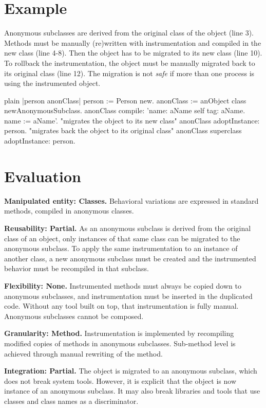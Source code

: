 \documentclass[10pt,twoside,english]{_support/latex/sbabook/sbabook}
\begin{document}
\section{Example}
Anonymous subclasses are derived from the original class of the object (line 3). Methods must be manually (re)written with instrumentation and compiled in the new class (line 4-8). Then the object has to be migrated to its new class (line 10). To rollback the instrumentation, the object must be manually migrated back to its original class (line 12). The migration is not \textit{safe} if more than one process is using the instrumented object.

\begin{displaycode}{plain}
|person anonClass|
  person := Person new.
	anonClass := anObject class newAnonymousSubclass.
	anonClass
		compile:
			'name: aName
				self tag: aName.
				name := aName'.
  "migrates the object to its new class"
	anonClass adoptInstance: person.
  "migrates back the object to its original class"
  anonClass superclass adoptInstance: person.
\end{displaycode}
\section{Evaluation}
\textbf{Manipulated entity: Classes.} Behavioral variations are expressed in standard methods, compiled in anonymous classes.

\textbf{Reusability: Partial.} As an anonymous subclass is derived from the original class of an object, only instances of that same class can be migrated to the anonymous subclass. To apply the same instrumentation to an instance of another class, a new anonymous subclass must be created and the instrumented behavior must be recompiled in that subclass.

\textbf{Flexibility: None.} Instrumented methods must always be copied down to anonymous subclasses, and instrumentation must be inserted in the duplicated code. Without any tool built on top, that instrumentation is fully manual. Anonymous subclasses cannot be composed.

\textbf{Granularity: Method.} Instrumentation is implemented by recompiling modified copies of methods in anonymous subclasses. Sub-method level is achieved through manual rewriting of the method.

\textbf{Integration: Partial.} The object is migrated to an anonymous subclass, which does not break system tools. However, it is explicit that the object is now instance of an anonymous subclass. It may also break libraries and tools that use classes and class names as a discriminator.
\end{document}
